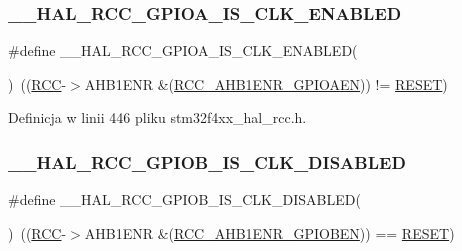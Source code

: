 \subsubsection{\texorpdfstring{\+\_\+\+\_\+\+H\+A\+L\+\_\+\+R\+C\+C\+\_\+\+G\+P\+I\+O\+A\+\_\+\+I\+S\+\_\+\+C\+L\+K\+\_\+\+E\+N\+A\+B\+L\+ED}{\_\_HAL\_RCC\_GPIOA\_IS\_CLK\_ENABLED}}
{\footnotesize\ttfamily \#define \+\_\+\+\_\+\+H\+A\+L\+\_\+\+R\+C\+C\+\_\+\+G\+P\+I\+O\+A\+\_\+\+I\+S\+\_\+\+C\+L\+K\+\_\+\+E\+N\+A\+B\+L\+ED(\begin{DoxyParamCaption}{ }\end{DoxyParamCaption})~((\hyperlink{group___peripheral__declaration_ga74944438a086975793d26ae48d5882d4}{R\+CC}-\/$>$A\+H\+B1\+E\+NR \&(\hyperlink{group___peripheral___registers___bits___definition_ga6ff46fb3b30fc6792e4fd18fcb0941b5}{R\+C\+C\+\_\+\+A\+H\+B1\+E\+N\+R\+\_\+\+G\+P\+I\+O\+A\+EN})) != \hyperlink{group___exported__types_gga89136caac2e14c55151f527ac02daaffa589b7d94a3d91d145720e2fed0eb3a05}{R\+E\+S\+ET})}



Definicja w linii 446 pliku stm32f4xx\+\_\+hal\+\_\+rcc.\+h.

\mbox{\label{group___r_c_c___a_h_b1___peripheral___clock___enable___disable___status_ga9b9353035473ac5f144f6e5385c4bebb}} 
\subsubsection{\texorpdfstring{\+\_\+\+\_\+\+H\+A\+L\+\_\+\+R\+C\+C\+\_\+\+G\+P\+I\+O\+B\+\_\+\+I\+S\+\_\+\+C\+L\+K\+\_\+\+D\+I\+S\+A\+B\+L\+ED}{\_\_HAL\_RCC\_GPIOB\_IS\_CLK\_DISABLED}}
{\footnotesize\ttfamily \#define \+\_\+\+\_\+\+H\+A\+L\+\_\+\+R\+C\+C\+\_\+\+G\+P\+I\+O\+B\+\_\+\+I\+S\+\_\+\+C\+L\+K\+\_\+\+D\+I\+S\+A\+B\+L\+ED(\begin{DoxyParamCaption}{ }\end{DoxyParamCaption})~((\hyperlink{group___peripheral__declaration_ga74944438a086975793d26ae48d5882d4}{R\+CC}-\/$>$A\+H\+B1\+E\+NR \&(\hyperlink{group___peripheral___registers___bits___definition_gad7f408f92e7fd49b0957b8cb4ff31ca5}{R\+C\+C\+\_\+\+A\+H\+B1\+E\+N\+R\+\_\+\+G\+P\+I\+O\+B\+EN})) == \hyperlink{group___exported__types_gga89136caac2e14c55151f527ac02daaffa589b7d94a3d91d145720e2fed0eb3a05}{R\+E\+S\+ET})}



